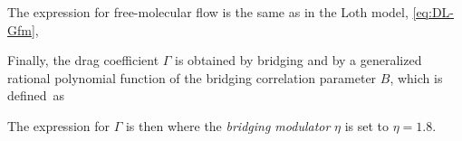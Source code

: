     The expression for free-molecular flow is the same as in the Loth model, \cref{eq:DL-Gfm},

    Finally, the drag coefficient $\Gamma$ is obtained by bridging  and 
    by a generalized rational polynomial function of the bridging correlation parameter $B$,
    which is defined~as

    The expression for $\Gamma$ is then
    where the \emph{bridging modulator} $\eta$ is set to $\eta = \num{1.8}$.
